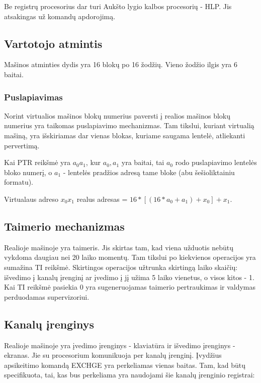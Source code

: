 \documentclass{VUMIFInfKursinis}
\begin{document}
Be registrų procesorius dar turi Aukšto lygio kalbos procesorių - HLP. Jis atsakingas už komandų apdorojimą.

\subsection{Vartotojo atmintis}

Mašinos atminties dydis yra 16 blokų po 16 žodžių. Vieno žodžio ilgis yra 6 baitai.

\subsubsection{Puslapiavimas}

Norint virtualios mašinos blokų numerius paversti į realios mašinos blokų numerius yra taikomas puslapiavimo mechanizmas. Tam tikslui, kuriant virtualią mašiną, yra išskiriamas dar vienas blokas, kuriame saugama lentelė, atliekanti pervertimą.

Kai PTR reikšmė yra $a_0a_1$, kur $a_0, a_1$ yra baitai, tai $a_0$ rodo puslapiavimo lentelės bloko numerį, o $a_1$ - lentelės pradžios adresą tame bloke (abu šešioliktainiu formatu).

Virtualaus adreso $x_0x_1$ realus adresas = $16 * [(16 * a_0 + a_1) + x_0] + x_1$.

\subsection{Taimerio mechanizmas}
Realioje mašinoje yra taimeris. Jis skirtas tam, kad viena užduotis nebūtų vykdoma daugiau nei 20 laiko momentų. Tam tikslui po kiekvienos operacijos yra sumažina TI reikšmė. Skirtingos operacijos užtrunka skirtingą laiko skaičių: išvedimo į kanalų įrenginį ar įvedimo į jį užima 5 laiko vienetus, o visos kitos - 1. Kai TI reikšmė pasiekia 0 yra sugeneruojamas taimerio pertraukimas ir valdymas perduodamas supervizoriui.

\subsection{Kanalų įrenginys}

Realioje mašinoje yra įvedimo įrenginys - klaviatūra ir išvedimo įrenginys - ekranas. Jie su procesorium komunikuoja per kanalų įrenginį. Įvydžius apsikeitimo komandą EXCHGE yra perkeliamas vienas baitas. Tam, kad būtų specifikuota, tai, kas bus perkeliama yra naudojami šie kanalų įrenginio registrai:
\end{document}
